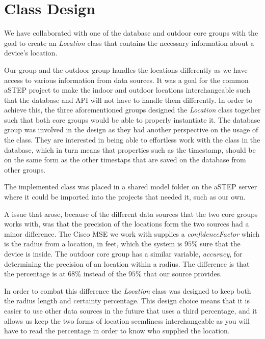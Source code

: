 \section{Class Design}
We have collaborated with one of the database and outdoor core groups with the goal to create an \textit{Location} class that contains the necessary information about a device's location. 

Our group and the outdoor group handles the locations differently as we have access to various information from data sources. It was a goal for the common aSTEP project to make the indoor and outdoor locations interchangeable such that the database and API will not have to handle them differently. In order to achieve this, the three aforementioned groups designed the \textit{Location} class together such that both core groups would be able to properly instantiate it. The database group was involved in the design as they had another perspective on the usage of the class. They are interested in being able to effortless work with the class in the database, which in turn means that properties such as the timestamp, should be on the same form as the other timestaps that are saved on the database from other groups. 

The implemented class was placed in a shared model folder on the aSTEP server %
where it could be imported into the projects that needed it, such as our own. 

A issue that arose, because of the different data sources that the two core groups works with, was that the precision of the locations form the two sources had a minor difference. The Cisco MSE we work with supplies a \textit{confidenceFactor} which is the radius from a location, in feet, which the system is $95\%$ sure that the device is inside\cite{MSE_faq}. The outdoor core group has a similar variable, \textit{accuracy}, for determining the precision of an location within a radius. The difference is that the percentage is at $68\%$ instead of the $95\%$ that our source provides\cite{android_getAccuracy}. 

In order to combat this difference the \textit{Location} class was designed to keep both the radius length and certainty percentage. This design choice means that it is easier to use other data sources in the future that uses a third percentage, and it allows us keep the two forms of location seemliness interchangeable as you will have to read the percentage in order to know who supplied the location.